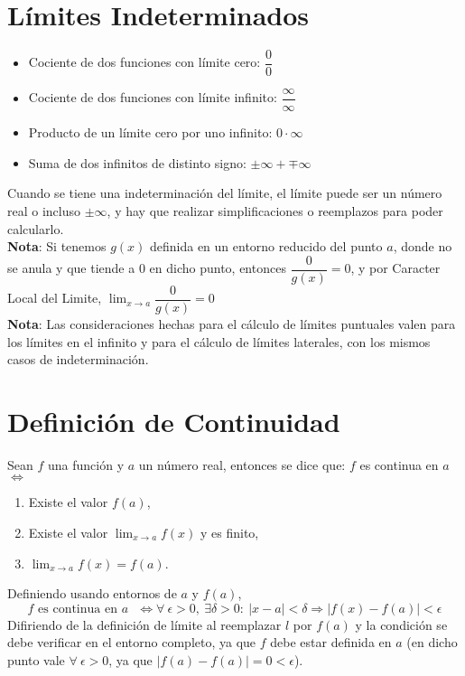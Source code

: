 \documentclass[11pt,a4paper]{article}
\begin{document}
\section{L\'imites Indeterminados}
\begin{itemize}
\item Cociente de dos funciones con l\'imite cero: $\dfrac{0}{0}$
\item Cociente de dos funciones con l\'imite infinito: $\dfrac{\infty}{\infty}$
\item Producto de un l\'imite cero por uno infinito: $0\cdot \infty$
\item Suma de dos infinitos de distinto signo: $\pm \infty + \mp \infty$
\end{itemize}
Cuando se tiene una indeterminaci\'on del l\'imite, el l\'imite puede ser un n\'umero real o incluso $\pm \infty$, y hay que realizar simplificaciones o reemplazos para poder calcularlo.\\
\textbf{Nota}: Si tenemos $g(x)$ definida en un entorno reducido del punto $a$, donde no se anula y que tiende a $0$ en dicho punto, entonces $\dfrac{0}{g(x)} = 0$, y por Caracter Local del Limite, $\displaystyle{\lim_{x \to a} \dfrac{0}{g(x)} = 0}$\\
\textbf{Nota}: Las consideraciones hechas para el c\'alculo de l\'imites puntuales valen para los l\'imites en el infinito y para el c\'alculo de l\'imites laterales, con los mismos casos de indeterminaci\'on.

\section{Definici\'on de Continuidad}
Sean $f$ una funci\'on y $a$ un n\'umero real, entonces se dice que: $f$ es continua en $a$ $\iff$
\begin{enumerate}
\item Existe el valor $f(a)$,
\item Existe el valor $\displaystyle{\lim_{x \to a} f(x)}$ y es finito,
\item $\displaystyle{\lim_{x \to a} f(x) = f(a)}$.
\end{enumerate}
Definiendo usando entornos de $a$ y $f(a)$, $$\text{$f$ es continua en $a$ } \iff \forall\ \epsilon > 0,\ \exists \delta > 0 :\ |x-a|<\delta \Rightarrow |f(x)-f(a)| < \epsilon$$
Difiriendo de la definici\'on de l\'imite al reemplazar $l$ por $f(a)$ y la condici\'on se debe verificar en el entorno completo, ya que $f$ debe estar definida en $a$ (en dicho punto vale $\forall\ \epsilon>0$, ya que $|f(a)-f(a)| = 0 < \epsilon$).
\end{document}
